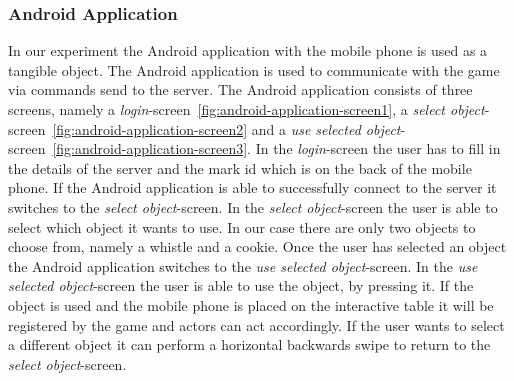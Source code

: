 \documentclass[a4paper,10pt]{report}
\begin{document}
	\subsubsection{Android Application}
	In our experiment the Android application with the mobile phone is used as a tangible object.
	The Android application is used to communicate with the game via commands send to the server.
	The Android application consists of three screens, namely a \emph{login}-screen~\ref{fig:android-application-screen1}, a \emph{select object}-screen~\ref{fig:android-application-screen2} and a \emph{use selected object}-screen~\ref{fig:android-application-screen3}.
	In the \emph{login}-screen the user has to fill in the details of the server and the mark id which is on the back of the mobile phone.
	If the Android application is able to successfully connect to the server it switches to the \emph{select object}-screen.
	In the \emph{select object}-screen the user is able to select which object it wants to use.
	In our case there are only two objects to choose from, namely a whistle and a cookie.
	Once the user has selected an object the Android application switches to the \emph{use selected object}-screen.
	In the \emph{use selected object}-screen the user is able to use the object, by pressing it.
	If the object is used and the mobile phone is placed on the interactive table it will be registered by the game and actors can act accordingly.
	If the user wants to select a different object it can perform a horizontal backwards swipe to return to the \emph{select object}-screen.
	
\end{document}
